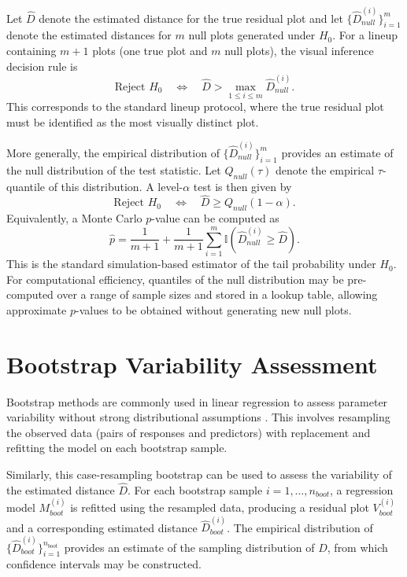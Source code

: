 \documentclass[]{interact}
\theoremstyle{plain}%
\theoremstyle{definition}
\theoremstyle{remark}
\begin{document}
Let \(\hat{D}\) denote the estimated distance for the true residual plot
and let \(\{\hat{D}_{null}^{(i)}\}_{i=1}^{m}\) denote the estimated
distances for \(m\) null plots generated under \(H_0\). For a lineup
containing \(m + 1\) plots (one true plot and \(m\) null plots), the
visual inference decision rule is
\[\text{Reject } H_0 \quad \Longleftrightarrow \quad \hat{D} > \max_{1\le i\le m} \hat{D}_{null}^{(i)}.\]
This corresponds to the standard lineup protocol, where the true
residual plot must be identified as the most visually distinct plot.

More generally, the empirical distribution of
\(\{\hat{D}_{null}^{(i)}\}_{i=1}^{m}\) provides an estimate of the null
distribution of the test statistic. Let \(Q_{null}(\tau)\) denote the
empirical \(\tau\)-quantile of this distribution. A level-\(\alpha\)
test is then given by
\[\text{Reject } H_0 \quad \Longleftrightarrow \quad \hat{D} \ge Q_{null}(1-\alpha).\]
Equivalently, a Monte Carlo \(p\)-value can be computed as
\[\hat{p} = \frac{1}{m + 1} + \frac{1}{m + 1}\sum_{i=1}^{m} \mathbb{I}\left( \hat{D}_{null}^{(i)} \ge \hat{D} \right).\]
This is the standard simulation-based estimator of the tail probability
under \(H_0\). For computational efficiency, quantiles of the null
distribution may be pre-computed over a range of sample sizes and stored
in a lookup table, allowing approximate \(p\)-values to be obtained
without generating new null plots.

\section{Bootstrap Variability
Assessment}\label{sec-bootstrap-assessment}

Bootstrap methods are commonly used in linear regression to assess
parameter variability without strong distributional assumptions
\citep{davison1997bootstrap, efron1994introduction}. This involves
resampling the observed data (pairs of responses and predictors) with
replacement and refitting the model on each bootstrap sample.

Similarly, this case-resampling bootstrap can be used to assess the
variability of the estimated distance \(\hat{D}\). For each bootstrap
sample \(i=1, \ldots, n_{boot}\), a regression model \(M_{boot}^{(i)}\)
is refitted using the resampled data, producing a residual plot
\(V_{boot}^{(i)}\) and a corresponding estimated distance
\(\hat{D}_{boot}^{(i)}\). The empirical distribution of
\(\{\hat{D}_{boot}^{(i)}\}_{i=1}^{n_{boot}}\) provides an estimate of
the sampling distribution of \(\hat{D}\), from which confidence
intervals may be constructed.
\end{document}
